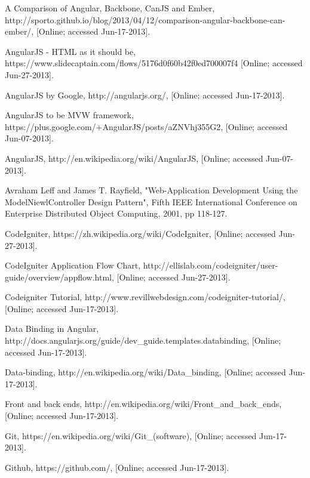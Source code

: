 \documentclass[a4paper,12pt]{report}
\begin{document}
\begin{thebibliography}{1}
A Comparison of Angular, Backbone, CanJS and Ember, http://sporto.github.io/blog/2013/04/12/comparison-angular-backbone-can-ember/, [Online; accessed Jun-17-2013]. 

AngularJS - HTML as it should be, https://www.slidecaptain.com/flows/5176d0f60b42f0ed700007f4 [Online; accessed Jun-27-2013]. 

AngularJS by Google, http://angularjs.org/, [Online; accessed Jun-17-2013]. 

AngularJS to be MVW framework, https://plus.google.com/+AngularJS/posts/aZNVhj355G2, [Online; accessed Jun-07-2013]. 

AngularJS, http://en.wikipedia.org/wiki/AngularJS, [Online; accessed Jun-07-2013]. 

Avraham Leff and James T. Rayfield, "Web-Application Development Using the ModelNiewlController Design Pattern", Fifth IEEE International Conference on Enterprise Distributed Object Computing, 2001, pp 118-127. 

CodeIgniter, https://zh.wikipedia.org/wiki/CodeIgniter, [Online; accessed Jun-27-2013]. 

CodeIgniter Application Flow Chart, http://ellislab.com/codeigniter/user-guide/overview/appflow.html, [Online; accessed Jun-27-2013]. 

Codeigniter Tutorial, http://www.revillwebdesign.com/codeigniter-tutorial/, [Online; accessed Jun-17-2013]. 

Data Binding in Angular, http://docs.angularjs.org/guide/dev\_guide.templates.databinding, [Online; accessed Jun-17-2013]. 

Data-binding, http://en.wikipedia.org/wiki/Data\_binding, [Online; accessed Jun-17-2013]. 

Front and back ends, http://en.wikipedia.org/wiki/Front\_and\_back\_ends, [Online; accessed Jun-17-2013]. 

Git, https://en.wikipedia.org/wiki/Git\_(software), [Online; accessed Jun-17-2013]. 

Github, https://github.com/, [Online; accessed Jun-17-2013]. 


\end{thebibliography}
\end{document}
